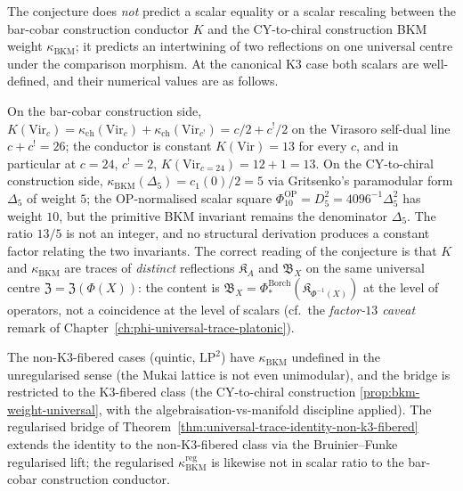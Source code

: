 \begin{remark}
\label{rem:universal-trace-identity-numerical}
The conjecture does \emph{not} predict a scalar equality or a scalar
rescaling between the bar-cobar construction conductor $K$ and the CY-to-chiral construction BKM weight
$\kappa_{\mathrm{BKM}}$; it predicts an intertwining of two reflections
on one universal centre under the comparison morphism. At the canonical K$3$
case both scalars are well-defined, and their numerical values are
as follows.

On the bar-cobar construction side, $K(\mathrm{Vir}_{c}) = \kappa_{\mathrm{ch}}(\mathrm{Vir}_c) + \kappa_{\mathrm{ch}}(\mathrm{Vir}_{c^!}) = c/2 + c^!/2$ on
the Virasoro self-dual line $c + c^! = 26$; the conductor is constant
$K(\mathrm{Vir}) = 13$ for every $c$, and in particular at $c = 24$,
$c^! = 2$, $K(\mathrm{Vir}_{c=24}) = 12 + 1 = 13$. On the CY-to-chiral construction side,
$\kappa_{\mathrm{BKM}}(\Delta_5) = c_1(0)/2 = 5$ via Gritsenko's paramodular
form $\Delta_5$ of weight $5$; the OP-normalised scalar square
\(\Phi_{10}^{\mathrm{OP}}=D_5^2=4096^{-1}\Delta_5^2\) has weight
\(10\), but the primitive BKM invariant remains the denominator
\(\Delta_5\). The ratio
$13 / 5$ is not an integer, and no structural derivation produces a
constant factor relating the two invariants. The
correct reading of the conjecture is that $K$ and $\kappa_{\mathrm{BKM}}$
are traces of \emph{distinct} reflections $\mathfrak{K}_A$ and
$\mathfrak{B}_X$ on the same universal centre
$\mathfrak{Z} = \mathfrak{Z}(\Phi(X))$: the content is
$\mathfrak{B}_X = \Phi^{\mathrm{Borch}}_*(\mathfrak{K}_{\Phi^{-1}(X)})$
at the level of operators, not a coincidence at the level of scalars
(cf.\ the \emph{factor-$13$ caveat} remark of
Chapter~\ref{ch:phi-universal-trace-platonic}).

The non-K$3$-fibered cases (quintic, $\mathrm{LP}^2$) have
$\kappa_{\mathrm{BKM}}$ undefined in the unregularised sense (the Mukai
lattice is not even unimodular), and the bridge is restricted to the
K$3$-fibered class (the CY-to-chiral construction \ref{prop:bkm-weight-universal}, with the
algebraisation-vs-manifold discipline applied). The regularised bridge of
Theorem~\ref{thm:universal-trace-identity-non-k3-fibered} extends the
identity to the non-K$3$-fibered class via the Bruinier--Funke
regularised lift; the regularised $\kappa_{\mathrm{BKM}}^{\mathrm{reg}}$
is likewise not in scalar ratio to the bar-cobar construction conductor.
\end{remark}


